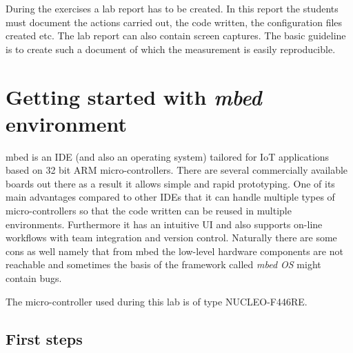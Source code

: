 \documentclass[a4paper]{article}
\begin{document}
During the exercises a lab report has to be created. In this report the students must document the actions carried out,
the code written, the configuration files created etc. The lab report can also contain screen captures. The basic
guideline is to create such a document of which the measurement is easily reproducible.

\section{Getting started with \emph{\textbf{mbed}} environment}

mbed is an IDE (and also an operating system) tailored for IoT applications based on 32 bit ARM micro-controllers. There
are several commercially available boards out there as a result it allows simple and rapid prototyping. One of its main
advantages compared to other IDEs that it can handle multiple types of micro-controllers so that the code written can
be reused in multiple environments. Furthermore it has an intuitive UI and also supports on-line workflows with team
integration and version control. Naturally there are some cons as well namely that from mbed the low-level hardware
components are not reachable and sometimes the basis of the framework called \emph{mbed OS} might contain bugs.

The micro-controller used during this lab is of type NUCLEO-F446RE.

\subsection{First steps}
\end{document}
